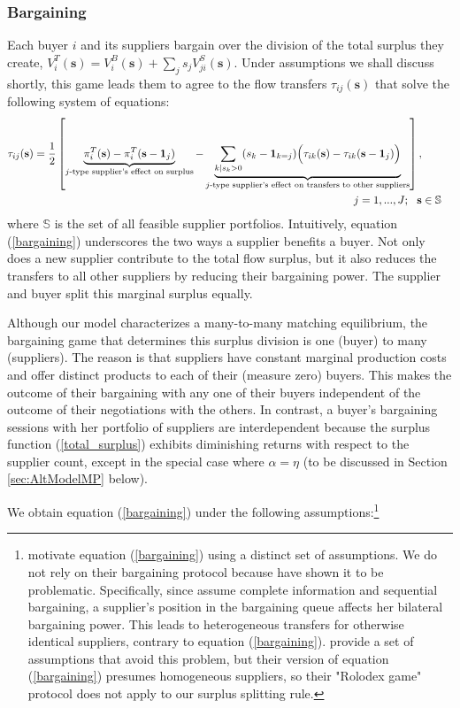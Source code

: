 \documentclass[12pt]{article} \usepackage{amsmath,amssymb,amsthm,geometry,graphicx,setspace,algorithm,algpseudocode,float}
\begin{document}
\subsubsection{Bargaining}
\label{sec:bargaining}
Each buyer $i$ and its suppliers bargain over the division of the total surplus they create, $V_i^{T}(\mathbf{s})=V_i^{B}(\mathbf{s}
)+\sum_{j}s_{j}V_{ji}^{S}(\mathbf{s})$. Under assumptions we shall discuss shortly, this game leads them to agree to the flow transfers $\tau_{ij}(\mathbf{s})$ that solve the following system of equations: 
\begin{align}
\label{bargaining}
\tau_{ij}(\mathbf{s}) = \frac{1}{2} \left[  \underbrace{\pi_i^T(\mathbf{s}) -  \pi_i^T(\mathbf{s}-\mathbf{1}_j)}_{\text{$j$-type supplier's effect on surplus}} 
-\underbrace{\sum_{k  \mid  s_k>0}(s_k-\mathbf{1}_{k=j})  \Bigl(\tau_{ik}(\mathbf{s})-\tau_{ik}(\mathbf{s}-\mathbf{1}_j)\Bigr)}_{\text{$j$-type supplier's effect on transfers to other suppliers}} \right], 
\\ j=1,...,J; \ \ \mathbf{s} & \in \mathbb{S} \nonumber
\end{align}
where $\mathbb{S}$ is the set of all feasible supplier portfolios. Intuitively, equation (\ref{bargaining}) underscores the two ways a supplier benefits a buyer. Not only does a new supplier contribute to the total flow surplus, but it also reduces the transfers to all other suppliers by reducing their bargaining power. The supplier and buyer split this marginal surplus equally.
\par
Although our model characterizes a many-to-many matching equilibrium, the bargaining game that determines this surplus division is one (buyer) to many (suppliers). The reason is that suppliers have constant marginal production costs and offer distinct products to each of their (measure zero) buyers. This makes the outcome of their bargaining with any one of their buyers independent of the outcome of their negotiations with the others. In contrast, a buyer’s bargaining sessions with her portfolio of suppliers are interdependent because the surplus function (\ref{total_surplus}) exhibits diminishing returns with respect to the supplier count, except in the special case where $\alpha = \eta$ (to be discussed in Section \ref{sec:AltModelMP} below).
\par
We obtain equation (\ref{bargaining}) under the following assumptions:\footnote{\citet{StoleZwiebel1996} motivate equation (\ref{bargaining}) using a distinct set of assumptions. We do not rely on their bargaining protocol because \citet{BrugemannGautierMenzio2017} have shown it to be problematic. Specifically, since \citet{StoleZwiebel1996} assume complete information and sequential bargaining, a supplier’s position in the bargaining queue affects her bilateral bargaining power. This leads to heterogeneous transfers for otherwise identical suppliers, contrary to equation (\ref{bargaining}). \citet{BrugemannGautierMenzio2017} provide a set of assumptions that avoid this problem, but their version of equation (\ref{bargaining}) presumes homogeneous suppliers, so their "Rolodex game" protocol does not apply to our surplus splitting rule.
\medskip}
\end{document}
